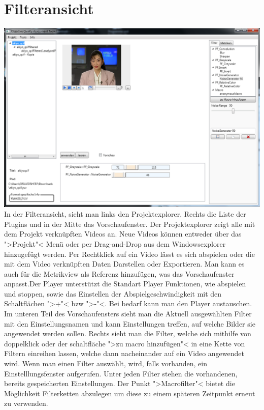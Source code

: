 \chapter{Filteransicht}
\includegraphics[scale=0.55]{bilder/Filter.png}\\[5ex]
In der Filteransicht, sieht man links den Projektexplorer, Rechts die Liste der Plugins und in der Mitte das Vorschaufenster.
Der Projektexplorer zeigt alle mit dem Projekt verknüpften Videos an. Neue Videos können entweder über das ">Projekt"< Menü oder per Drag-and-Drop aus dem Windowsexplorer hinzugefügt werden.
Per Rechtklick auf ein Video lässt es sich abspielen oder die mit dem Video verknüpften Daten Darstellen oder Exportieren. Man kann es auch für die Metrikview als Referenz hinzufügen, was das Vorschaufenster anpasst.Der Player unterstützt die Standart Player Funktionen, wie abspielen und stoppen, sowie das Einstellen der Abspielgeschwindigkeit mit den Schaltflächen ">+"< bzw ">-"<. Bei bedarf kann man den Player austauschen. Im unteren Teil des Vorschaufensters sieht man die Aktuell ausgewählten Filter mit den Einstellungsnamen und kann Einstellungen treffen, auf welche Bilder sie angewendet werden sollen. Rechts sieht man die Filter, welche sich mithilfe von doppelklick oder der schaltfläche ">zu macro hinzufügen"< in eine Kette von Filtern einreihen lassen, welche dann nacheinander auf ein Video angewendet wird. Wenn man einen  Filter auswählt, wird, falls vorhanden, ein Einstelllungsfenster aufgerufen. Unter jeden Filter stehen die vorhandenen, bereits gespeicherten Einstellungen. Der Punkt ">Macrofilter"< bietet die Möglichkeit Filterketten abzulegen um diese zu einem späteren Zeitpunkt erneut zu verwenden.


